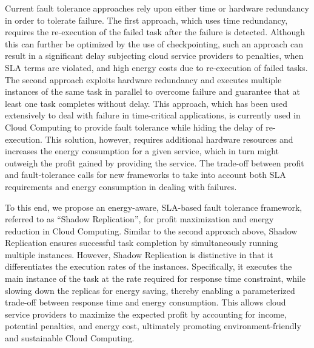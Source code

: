Current fault tolerance approaches rely upon either time or hardware
redundancy in order to tolerate failure. The first approach, which
uses time redundancy, requires the re-execution of the failed task
after the failure is detected. Although this can further be optimized
by the use of checkpointing, such an approach
can result in a significant delay subjecting cloud service providers to penalties, when SLA terms are violated,
and high energy costs due to re-execution of failed tasks.
The second approach exploits hardware redundancy and executes multiple
instances of the same task in parallel to overcome failure and
guarantee that at least one task completes without delay.  This approach,
which has been used extensively to deal with failure in time-critical
applications, is currently used in Cloud Computing to provide fault
tolerance while hiding the delay of
re-execution. This solution,
however, requires additional hardware resources and increases the energy consumption for a given service, which
in turn might outweigh the profit gained by providing the service.
The trade-off between profit and fault-tolerance calls for new
frameworks to take into account both SLA requirements and energy consumption in
dealing with failures.

To this end, we propose an energy-aware, SLA-based fault tolerance framework, referred to as “Shadow Replication”, for profit maximization and energy reduction in Cloud Computing. Similar to the second approach above, Shadow Replication ensures successful task completion by simultaneously running multiple instances. However, Shadow Replication is distinctive in that it differentiates the execution rates of the instances. Specifically, it 
executes the main instance of the task at the rate required for response time constraint, while slowing down the replicas for energy saving, thereby enabling a parameterized trade-off between response time and energy consumption. This allows cloud service providers to maximize the expected profit by accounting for income, potential penalties, and energy cost, ultimately promoting environment-friendly and sustainable Cloud Computing.
